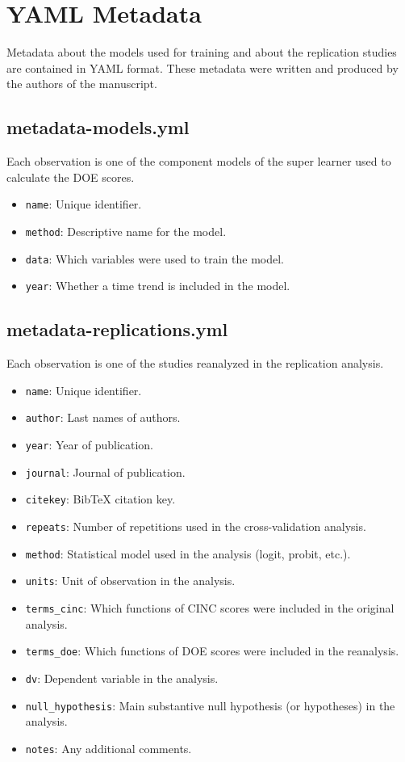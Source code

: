 \documentclass[12pt]{article}
\begin{document}
\section{YAML Metadata}

Metadata about the models used for training and about the replication studies are contained in YAML format.
These metadata were written and produced by the authors of the manuscript.

\subsection{metadata-models.yml}

Each observation is one of the component models of the super learner used to calculate the DOE scores.

\begin{itemize}
  \item \texttt{name}: Unique identifier.
  \item \texttt{method}: Descriptive name for the model.
  \item \texttt{data}: Which variables were used to train the model.
  \item \texttt{year}: Whether a time trend is included in the model.
\end{itemize}

\subsection{metadata-replications.yml}

Each observation is one of the studies reanalyzed in the replication analysis.

\begin{itemize}
  \item \texttt{name}: Unique identifier.
  \item \texttt{author}: Last names of authors.
  \item \texttt{year}: Year of publication.
  \item \texttt{journal}: Journal of publication.
  \item \texttt{citekey}: BibTeX citation key.
  \item \texttt{repeats}: Number of repetitions used in the cross-validation analysis.
  \item \texttt{method}: Statistical model used in the analysis (logit, probit, etc.).
  \item \texttt{units}: Unit of observation in the analysis.
  \item \texttt{terms\_cinc}: Which functions of CINC scores were included in the original analysis.
  \item \texttt{terms\_doe}: Which functions of DOE scores were included in the reanalysis.
  \item \texttt{dv}: Dependent variable in the analysis.
  \item \texttt{null\_hypothesis}: Main substantive null hypothesis (or hypotheses) in the analysis.
  \item \texttt{notes}: Any additional comments.
\end{itemize}




\end{document}
